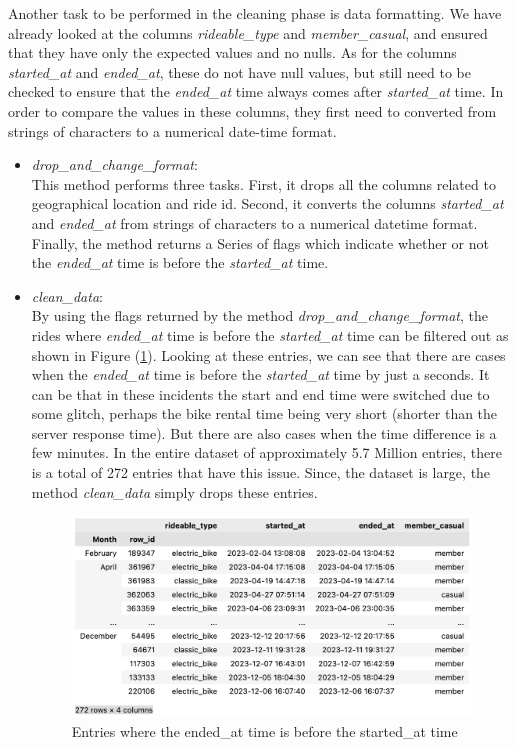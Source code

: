 \documentclass[12pt]{article}
\begin{document}
Another task to be performed in the cleaning phase is data formatting. We have already looked at the columns \textit{rideable\_type} and \textit{member\_casual}, and ensured that they have only the expected values and no nulls. As for the columns \textit{started\_at} and \textit{ended\_at}, these do not have null values, but still need to be checked to ensure that the \textit{ended\_at} time always comes after \textit{started\_at} time. In order to compare the values in these columns, they first need to converted from strings of characters to a numerical date-time format. \\

\begin{itemize}
	\item \textit{drop\_and\_change\_format}:\\
	  This method performs three tasks. First, it drops all the columns related to geographical location and ride id. Second, it converts the columns \textit{started\_at} and \textit{ended\_at} from strings of characters to a numerical datetime format. Finally, the method returns a Series of flags which indicate whether or not the \textit{ended\_at} time is before the \textit{started\_at} time. 
	  
	  \item \textit{clean\_data}:\\
	  By using the flags returned by the method \textit{drop\_and\_change\_format}, the rides where \textit{ended\_at} time is before the \textit{started\_at} time can be filtered out as shown in Figure (\ref{fig8}). Looking at these entries, we can see that there are cases when the \textit{ended\_at} time is before the \textit{started\_at} time by just a seconds. It can be that in these incidents the start and end time were switched due to some glitch, perhaps the bike rental time being very short (shorter than the server response time). But there are also cases when the time difference is a few minutes. In the entire dataset of approximately 5.7 Million entries, there is a total of 272 entries that have this issue. Since, the dataset is large, the method \textit{clean\_data} simply drops these entries. \\

	\begin{figure}[h]
	\centering
	\includegraphics[scale=0.6]{imgNEG.png}
	\caption{Entries where the ended\_at time is before the started\_at time}
	\label{fig8}
	\end{figure}
	
	\end{itemize}
	
\end{document}
